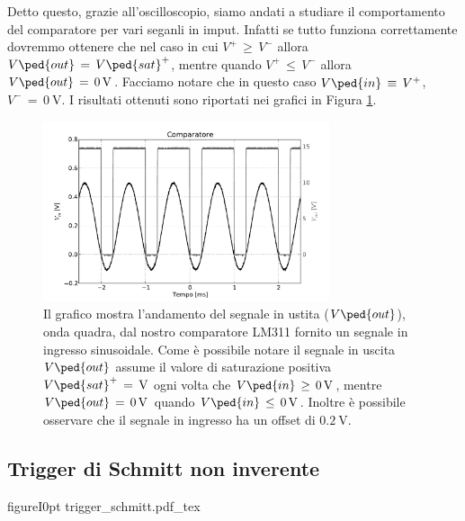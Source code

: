 Detto questo, grazie all'oscilloscopio, siamo andati a studiare il comportamento del comparatore per vari seganli in imput. Infatti se tutto funziona correttamente dovremmo ottenere che nel caso in cui $V^+\,\geq\,V^-$ allora $V\ped{out}\,=\,V\ped{sat}^+$, mentre quando $V^+\,\leq\,V^-$ allora $V\ped{out}\,=\,\SI{0}{\volt}$. Facciamo notare che in questo caso $V\ped{in}\,\equiv\,V^+$, $V^-\,=\,\SI{0}{\volt}$. I risultati ottenuti sono riportati nei grafici in Figura \ref{fig:comparatore_plot}.

\begin{figure}
    \centering
    \includegraphics[width=0.75\textwidth]{figure/comp_graph.pdf}
    \caption{Il grafico mostra l'andamento del segnale in ustita ($V\ped{out}$), onda quadra, dal nostro comparatore LM311 fornito un segnale in ingresso sinusoidale. Come è possibile notare il segnale in uscita $V\ped{out}$ assume il valore di saturazione positiva $V\ped{sat}^+\,=\,\SI{}{\volt}$ ogni volta che $V\ped{in}\,\geq\,\SI{0}{\volt}$, mentre $V\ped{out}\,=\,\SI{0}{\volt}$ quando $V\ped{in}\,\leq\,\SI{0}{\volt}$. Inoltre è possibile osservare che il segnale in ingresso ha un offset di $\SI{0.2}{\volt}$.}
    \label{fig:comparatore_plot}
\end{figure}

\subsection*{Trigger di Schmitt non inverente}

\begin{wrapfloat}{figure}{I}{0pt}
        \def\svgwidth{0.45\textwidth}
        {trigger_schmitt.pdf_tex}
        \caption{Trigger di Schmitt. Il comparatore è usato in configurazione non invertente, inoltre è presente un ramo di retroazione positiva e non negativa.}
        \label{fig:trigger_schmitt}
\end{wrapfloat}

